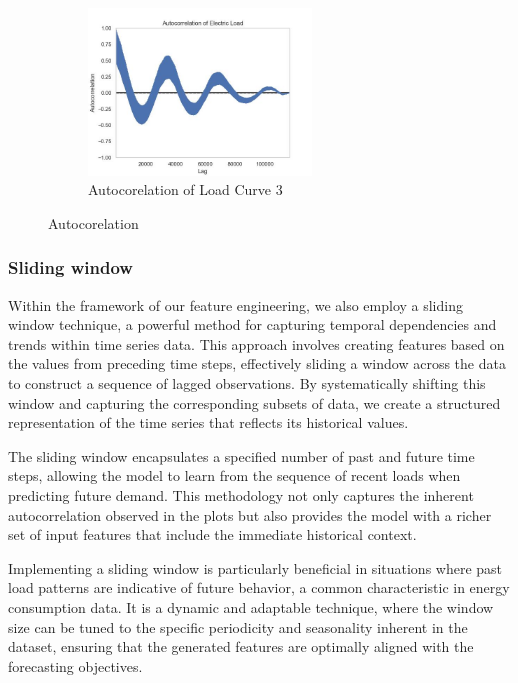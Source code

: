 \documentclass{article} %
\begin{document}
\begin{figure}[H]
    \begin{subfigure}[b]{\textwidth}
        \centering
        \includegraphics[width=0.65\textwidth]{ressources/Autocorrelation/lectricLoad_autocorrelation(2).jpg}
        \caption{Autocorelation of Load Curve 3}
        \label{fig:autocorrelation3}
    \end{subfigure}
    \caption{Autocorelation}
    \label{fig:autocorrelation}
\end{figure}
\subsubsection{Sliding window}
Within the framework of our feature engineering, we also employ a sliding window technique, a powerful method for capturing temporal dependencies and trends within time series data. This approach involves creating features based on the values from preceding time steps, effectively sliding a window across the data to construct a sequence of lagged observations. By systematically shifting this window and capturing the corresponding subsets of data, we create a structured representation of the time series that reflects its historical values. 

The sliding window encapsulates a specified number of past and future time steps, allowing the model to learn from the sequence of recent loads when predicting future demand. This methodology not only captures the inherent autocorrelation observed in the plots but also provides the model with a richer set of input features that include the immediate historical context. 

Implementing a sliding window is particularly beneficial in situations where past load patterns are indicative of future behavior, a common characteristic in energy consumption data. It is a dynamic and adaptable technique, where the window size can be tuned to the specific periodicity and seasonality inherent in the dataset, ensuring that the generated features are optimally aligned with the forecasting objectives. 
\end{document}

